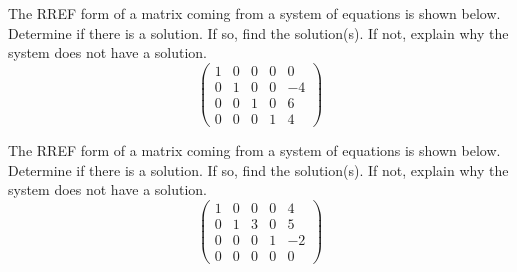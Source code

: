 \documentclass[11pt,letterpaper]{article}
\begin{document}
\newpage



 The RREF form of a matrix coming from a system of equations is shown below. Determine if there is a solution. If so, find the solution(s). If not, explain why the system does not have a solution. 
	\[
	\begin{pmatrix}
	1 & 0 & 0 & 0 & 0 \\
	0 & 1 & 0 & 0 & -4 \\
	0 & 0 & 1 & 0 & 6 \\
	0 & 0 & 0 & 1 & 4
	\end{pmatrix}
	\]



\newpage



 The RREF form of a matrix coming from a system of equations is shown below. Determine if there is a solution. If so, find the solution(s). If not, explain why the system does not have a solution. 
	\[
	\begin{pmatrix}
	1 & 0 & 0 & 0 & 4 \\
	0 & 1 & 3 & 0 & 5 \\
	0 & 0 & 0 & 1 & -2 \\
	0 & 0 & 0 & 0 & 0
	\end{pmatrix}
	\]
\end{document}
